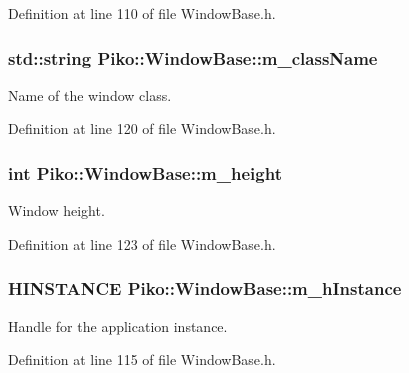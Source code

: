 Definition at line 110 of file Window\-Base.\-h.

\hypertarget{class_piko_1_1_window_base_ad6491bf8d178a85c5d57c9d2ef5ec706}{
\subsubsection[{m\-\_\-class\-Name}]{\setlength{\rightskip}{0pt plus 5cm}std\-::string Piko\-::\-Window\-Base\-::m\-\_\-class\-Name\hspace{0.3cm}{\ttfamily [private]}}}\label{d5/d35/class_piko_1_1_window_base_ad6491bf8d178a85c5d57c9d2ef5ec706}
Name of the window class. 

Definition at line 120 of file Window\-Base.\-h.

\hypertarget{class_piko_1_1_window_base_a66935c150f9a052b2f9fd5ec5e9116a2}{
\subsubsection[{m\-\_\-height}]{\setlength{\rightskip}{0pt plus 5cm}int Piko\-::\-Window\-Base\-::m\-\_\-height\hspace{0.3cm}{\ttfamily [private]}}}\label{d5/d35/class_piko_1_1_window_base_a66935c150f9a052b2f9fd5ec5e9116a2}
Window height. 

Definition at line 123 of file Window\-Base.\-h.

\hypertarget{class_piko_1_1_window_base_a84ca71a9b2cfe6ff0a7530a127fad31c}{
\subsubsection[{m\-\_\-h\-Instance}]{\setlength{\rightskip}{0pt plus 5cm}H\-I\-N\-S\-T\-A\-N\-C\-E Piko\-::\-Window\-Base\-::m\-\_\-h\-Instance\hspace{0.3cm}{\ttfamily [private]}}}\label{d5/d35/class_piko_1_1_window_base_a84ca71a9b2cfe6ff0a7530a127fad31c}
Handle for the application instance. 

Definition at line 115 of file Window\-Base.\-h.

